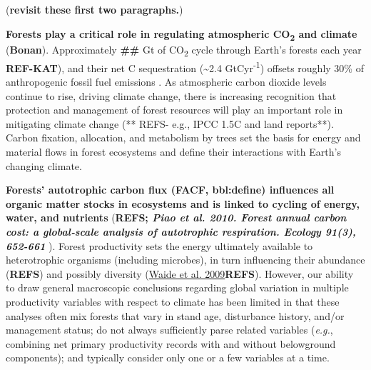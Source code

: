 \documentclass[]{article}
\begin{document}
(\textbf{revisit these first two paragraphs.})

\textbf{Forests play a critical role in regulating atmospheric
CO\textsubscript{2} and climate} (\textbf{Bonan}). Approximately
\textbf{\#\#} Gt of CO\textsubscript{2} cycle through Earth's forests
each year \textbf{REF-KAT}), and their net C sequestration
(\textasciitilde{}2.4 GtCyr\textsuperscript{-1}) offsets roughly 30\% of
anthropogenic fossil fuel emissions \citep{pan_large_2011}. As
atmospheric carbon dioxide levels continue to rise, driving climate
change, there is increasing recognition that protection and management
of forest resources will play an important role in mitigating climate
change (** REFS- e.g., IPCC 1.5C and land reports**). Carbon fixation,
allocation, and metabolism by trees set the basis for energy and
material flows in forest ecosystems and define their interactions with
Earth's changing climate.

\textbf{Forests' autotrophic carbon flux (FACF, bbl:define) influences
all organic matter stocks in ecosystems and is linked to cycling of
energy, water, and nutrients} (\textbf{REFS; \emph{Piao et al. 2010.
Forest annual carbon cost: a global‐scale analysis of autotrophic
respiration. Ecology 91(3), 652-661} }). Forest productivity sets the
energy ultimately available to heterotrophic organisms (including
microbes), in turn influencing their abundance (\textbf{REFS}) and
possibly diversity
(\href{https://www.annualreviews.org/doi/abs/10.1146/annurev.ecolsys.30.1.257}{Waide
et al. 2009}\textbf{REFS}). However, our ability to draw general
macroscopic conclusions regarding global variation in multiple
productivity variables with respect to climate has been limited in that
these analyses often mix forests that vary in stand age, disturbance
history, and/or management status; do not always sufficiently parse
related variables (\emph{e.g.}, combining net primary productivity
records with and without belowground components); and typically consider
only one or a few variables at a time.
\end{document}

